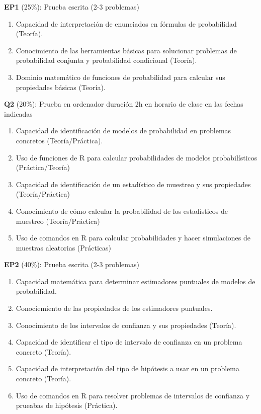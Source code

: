 \documentclass[
]{book}
\providecommand{\tightlist}{%
  \setlength{\itemsep}{0pt}\setlength{\parskip}{0pt}}
\begin{document}
\textbf{EP1} (25\%): Prueba escrita (2-3 problemas)

\begin{enumerate}
\def\labelenumi{\alph{enumi}.}
\tightlist
\item
  Capacidad de interpretación de enunciados en fórmulas de probabilidad (Teoría).
\item
  Conocimiento de las herramientas básicas para solucionar problemas de probabilidad conjunta y probabilidad condicional (Teoría).
\item
  Dominio matemático de funciones de probabilidad para calcular sus propiedades básicas (Teoría).
\end{enumerate}

\textbf{Q2} (20\%): Prueba en ordenador duración 2h en horario de clase en las fechas indicadas

\begin{enumerate}
\def\labelenumi{\alph{enumi}.}
\tightlist
\item
  Capacidad de identificación de modelos de probabilidad en problemas concretos (Teoría/Práctica).
\item
  Uso de funciones de R para calcular probabilidades de modelos probabilísticos (Práctica/Teoría)
\item
  Capacidad de identificación de un estadístico de muestreo y sus propiedades (Teoría/Práctica)
\item
  Conocimiento de cómo calcular la probabilidad de los estadísticos de muestreo (Teoría/Práctica)
\item
  Uso de comandos en R para calcular probabilidades y hacer simulaciones de muestras aleatorias (Prácticas)
\end{enumerate}

\textbf{EP2} (40\%): Prueba escrita (2-3 problemas)

\begin{enumerate}
\def\labelenumi{\alph{enumi}.}
\tightlist
\item
  Capacidad matemática para determinar estimadores puntuales de modelos de probabilidad.
\item
  Conociemiento de las propiedades de los estimadores puntuales.
\item
  Conocimiento de los intervalos de confianza y sus propiedades (Teoría).
\item
  Capacidad de identificar el tipo de intervalo de confianza en un problema concreto (Teoría).
\item
  Capacidad de interpretación del tipo
  de hipótesis a usar en un problema concreto (Teoría).
\item
  Uso de comandos en R para resolver problemas de intervalos de confianza y prueabas de hipótesis (Práctica).
\end{enumerate}
\end{document}
